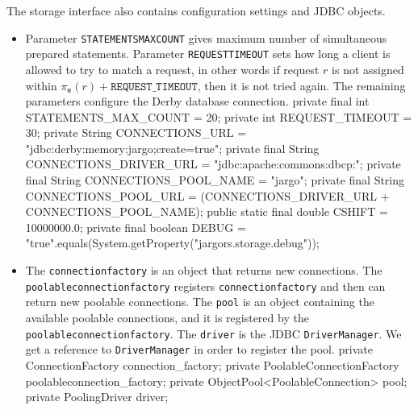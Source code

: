 The storage interface also contains configuration settings and JDBC objects.
\begin{itemize}
\item Parameter
{\tt{}STATEMENTS{}MAX{}COUNT} gives maximum number of simultaneous prepared
statements. Parameter {\tt{}REQUEST{}TIMEOUT} sets how long a client is allowed to
try to match a request, in other words if request $r$ is not assigned within
$\pi_\texttt{e}(r)+\texttt{REQUEST\_TIMEOUT}$, then it is not tried again.
The remaining parameters configure the Derby database connection.
\nwenddocs{}\plusendmoddef
private final int    STATEMENTS_MAX_COUNT   = 20;
private       int    REQUEST_TIMEOUT        = 30;
private       String CONNECTIONS_URL        = "jdbc:derby:memory:jargo;create=true";
private final String CONNECTIONS_DRIVER_URL = "jdbc:apache:commons:dbcp:";
private final String CONNECTIONS_POOL_NAME  = "jargo";
private final String CONNECTIONS_POOL_URL   = (CONNECTIONS_DRIVER_URL + CONNECTIONS_POOL_NAME);
public static final double CSHIFT           = 10000000.0;
private final boolean DEBUG =
    "true".equals(System.getProperty("jargors.storage.debug"));
\nwendcode{}\nwdocspar
\item The {\tt{}connection{}factory} is an object that returns new connections. The
{\tt{}poolableconnection{}factory} registers {\tt{}connection{}factory} and then can
return new poolable connections.  The {\tt{}pool} is an object containing the
available poolable connections, and it is registered by the
{\tt{}poolableconnection{}factory}. The {\tt{}driver} is the JDBC {\tt{}DriverManager}.
We get a reference to {\tt{}DriverManager} in order to register the pool.
\nwenddocs{}\plusendmoddef
private ConnectionFactory               connection_factory;
private PoolableConnectionFactory       poolableconnection_factory;
private ObjectPool<PoolableConnection>  pool;
private PoolingDriver                   driver;
\nwendcode{}\nwdocspar
\end{itemize}

